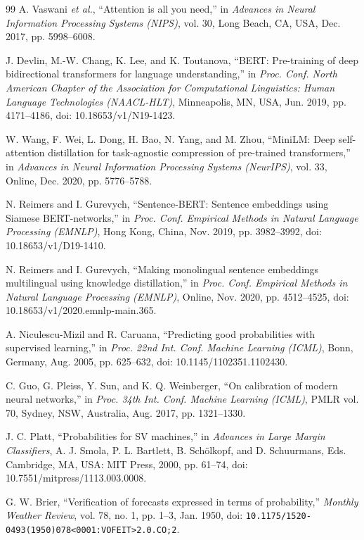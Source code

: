 \begin{thebibliography}{99}
A. Vaswani \textit{et al.}, ``Attention is all you need,'' in \textit{Advances in Neural Information Processing Systems (NIPS)}, vol. 30, Long Beach, CA, USA, Dec. 2017, pp. 5998--6008.

J. Devlin, M.-W. Chang, K. Lee, and K. Toutanova, ``BERT: Pre-training of deep bidirectional transformers for language understanding,'' in \textit{Proc. Conf. North American Chapter of the Association for Computational Linguistics: Human Language Technologies (NAACL-HLT)}, Minneapolis, MN, USA, Jun. 2019, pp. 4171--4186, doi: 10.18653/v1/N19-1423.

W. Wang, F. Wei, L. Dong, H. Bao, N. Yang, and M. Zhou, ``MiniLM: Deep self-attention distillation for task-agnostic compression of pre-trained transformers,'' in \textit{Advances in Neural Information Processing Systems (NeurIPS)}, vol. 33, Online, Dec. 2020, pp. 5776--5788.

N. Reimers and I. Gurevych, ``Sentence-BERT: Sentence embeddings using Siamese BERT-networks,'' in \textit{Proc. Conf. Empirical Methods in Natural Language Processing (EMNLP)}, Hong Kong, China, Nov. 2019, pp. 3982--3992, doi: 10.18653/v1/D19-1410.

N. Reimers and I. Gurevych, ``Making monolingual sentence embeddings multilingual using knowledge distillation,'' in \textit{Proc. Conf. Empirical Methods in Natural Language Processing (EMNLP)}, Online, Nov. 2020, pp. 4512--4525, doi: 10.18653/v1/2020.emnlp-main.365.

A. Niculescu-Mizil and R. Caruana, ``Predicting good probabilities with supervised learning,'' in \textit{Proc. 22nd Int. Conf. Machine Learning (ICML)}, Bonn, Germany, Aug. 2005, pp. 625--632, doi: 10.1145/1102351.1102430.

C. Guo, G. Pleiss, Y. Sun, and K. Q. Weinberger, ``On calibration of modern neural networks,'' in \textit{Proc. 34th Int. Conf. Machine Learning (ICML)}, PMLR vol. 70, Sydney, NSW, Australia, Aug. 2017, pp. 1321--1330.

J. C. Platt, ``Probabilities for SV machines,'' in \textit{Advances in Large Margin Classifiers}, A. J. Smola, P. L. Bartlett, B. Sch\"olkopf, and D. Schuurmans, Eds. Cambridge, MA, USA: MIT Press, 2000, pp. 61--74, doi: 10.7551/mitpress/1113.003.0008.

G. W. Brier, ``Verification of forecasts expressed in terms of probability,'' \textit{Monthly Weather Review}, vol. 78, no. 1, pp. 1--3, Jan. 1950, doi: {\nolinkurl{10.1175/1520-0493(1950)078<0001:VOFEIT>2.0.CO;2}}.


\end{thebibliography}
